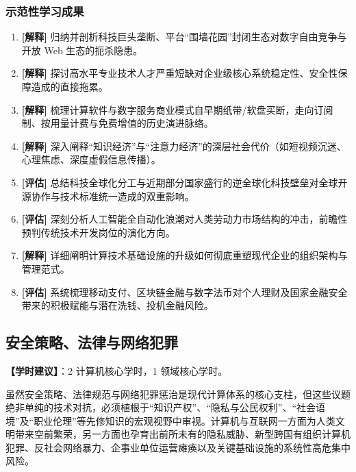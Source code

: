 \subsubsection{示范性学习成果}
\begin{enumerate}
    \item \textbf{[解释]} 归纳并剖析科技巨头垄断、平台“围墙花园”封闭生态对数字自由竞争与开放 Web 生态的扼杀隐患。
    \item \textbf{[解释]} 探讨高水平专业技术人才严重短缺对企业级核心系统稳定性、安全性保障造成的直接拖累。
    \item \textbf{[解释]} 梳理计算软件与数字服务商业模式自早期纸带/软盘买断，走向订阅制、按用量计费与免费增值的历史演进脉络。
    \item \textbf{[解释]} 深入阐释“知识经济”与“注意力经济”的深层社会代价（如短视频沉迷、心理焦虑、深度虚假信息传播）。
    \item \textbf{[评估]} 总结科技全球化分工与近期部分国家盛行的逆全球化科技壁垒对全球开源协作与技术标准统一造成的双重影响。
    \item \textbf{[评估]} 深刻分析人工智能全自动化浪潮对人类劳动力市场结构的冲击，前瞻性预判传统技术开发岗位的演化方向。
    \item \textbf{[解释]} 详细阐明计算技术基础设施的升级如何彻底重塑现代企业的组织架构与管理范式。
    \item \textbf{[评估]} 系统梳理移动支付、区块链金融与数字法币对个人理财及国家金融安全带来的积极赋能与潜在洗钱、投机金融风险。
\end{enumerate}

\subsection{安全策略、法律与网络犯罪}
\textbf{【学时建议】}：2 计算机核心学时，1 领域核心学时。

虽然安全策略、法律规范与网络犯罪惩治是现代计算体系的核心支柱，但这些议题绝非单纯的技术对抗，必须植根于“知识产权”、“隐私与公民权利”、“社会语境”及“职业伦理”等先修知识的宏观视野中审视。计算机与互联网一方面为人类文明带来空前繁荣，另一方面也孕育出前所未有的隐私威胁、新型跨国有组织计算机犯罪、反社会网络暴力、企事业单位运营瘫痪以及关键基础设施的系统性高危集中风险。

